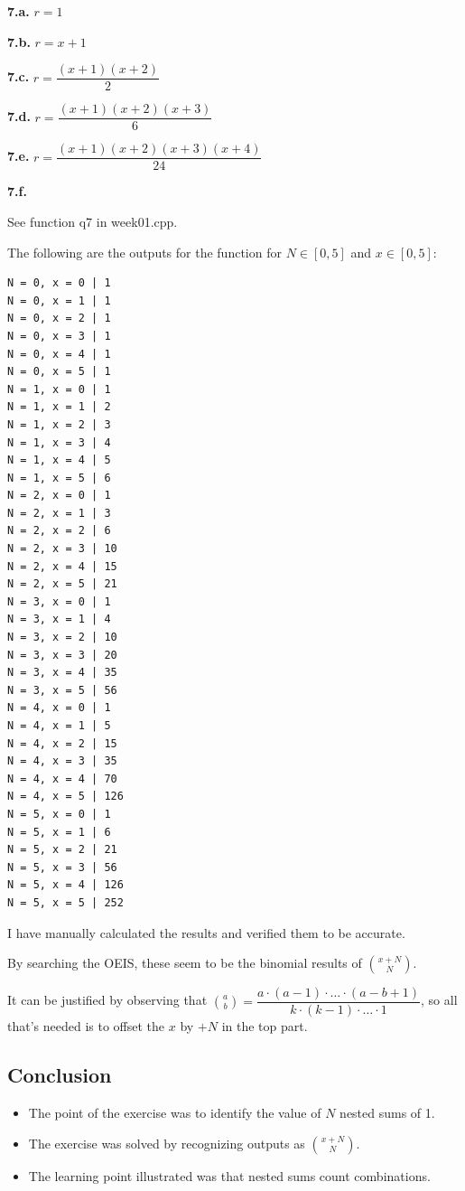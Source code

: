 \documentclass[12pt]{article}
\begin{document}
\textbf{7.a.} $r = 1$

\textbf{7.b.} $r = x + 1$

\textbf{7.c.} $r = \dfrac{(x + 1)(x + 2)}{2}$

\textbf{7.d.} $r = \dfrac{(x + 1)(x + 2)(x + 3)}{6}$

\textbf{7.e.} $r = \dfrac{(x + 1)(x + 2)(x + 3)(x + 4)}{24}$

\textbf{7.f.}

See function q7 in week01.cpp.

The following are the outputs for the function for $N \in [0,5]$ and
$x \in [0,5]$:

\begin{verbatim}
N = 0, x = 0 | 1
N = 0, x = 1 | 1
N = 0, x = 2 | 1
N = 0, x = 3 | 1
N = 0, x = 4 | 1
N = 0, x = 5 | 1
N = 1, x = 0 | 1
N = 1, x = 1 | 2
N = 1, x = 2 | 3
N = 1, x = 3 | 4
N = 1, x = 4 | 5
N = 1, x = 5 | 6
N = 2, x = 0 | 1
N = 2, x = 1 | 3
N = 2, x = 2 | 6
N = 2, x = 3 | 10
N = 2, x = 4 | 15
N = 2, x = 5 | 21
N = 3, x = 0 | 1
N = 3, x = 1 | 4
N = 3, x = 2 | 10
N = 3, x = 3 | 20
N = 3, x = 4 | 35
N = 3, x = 5 | 56
N = 4, x = 0 | 1
N = 4, x = 1 | 5
N = 4, x = 2 | 15
N = 4, x = 3 | 35
N = 4, x = 4 | 70
N = 4, x = 5 | 126
N = 5, x = 0 | 1
N = 5, x = 1 | 6
N = 5, x = 2 | 21
N = 5, x = 3 | 56
N = 5, x = 4 | 126
N = 5, x = 5 | 252
\end{verbatim}

I have manually calculated the results and verified them to be accurate.

By searching the OEIS, these seem to be the binomial results of
$\displaystyle\binom{x + N}{N}$.

It can be justified by observing that
$\displaystyle\binom{a}{b} = \dfrac{a \cdot (a - 1) \cdot \dots \cdot (a - b + 1)}{k \cdot (k - 1) \cdot \dots \cdot 1}$,
so all that's needed is to offset the $x$ by $+N$ in the top part.


\subsection{Conclusion}

\begin{itemize}

\item
  The point of the exercise was to identify the value of $N$ nested sums of 1.

\item
  The exercise was solved by recognizing outputs as $\binom{x + N}{N}$.

\item
  The learning point illustrated was that nested sums count combinations.

\end{itemize}
\end{document}
